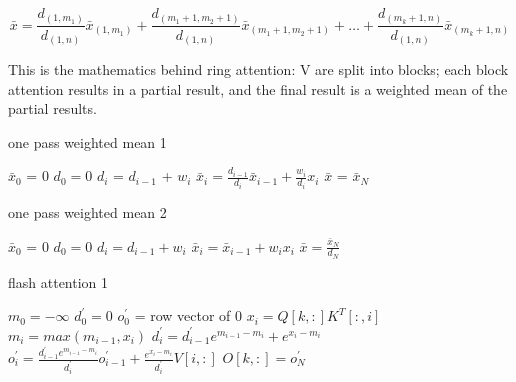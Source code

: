 \documentclass[a4paper]{article}
\begin{document}
    \begin{equation}
        \bar{x} = \frac{d_{(1,m_{1})}}{d_{(1,n)}} \bar{x}_{(1,m_{1})} + \frac{d_{(m_{1}+1,m_{2}+1)}}{d_{(1,n)}} \bar{x}_{(m_{1}+1,m_{2}+1)} +\dots + \frac{d_{(m_{k}+1,n)}}{d_{(1,n)}} \bar{x}_{(m_{k}+1,n)}
    \end{equation}

    This is the mathematics behind ring attention: V are split into blocks; each block attention results in a partial result, and the final result is a weighted mean of the partial results.

    \begin{algorithm}
        \caption{one pass weighted mean 1}
        \label{wm1}
        \begin{algorithmic}[1]
            \State $\bar{x}_{0}$ = $0$
            \State $d_0 = 0$
                \State $d_{i}$ = $d_{i-1}$ + $w_{i}$
                \State $\bar{x}_{i} = \frac{d_{i-1}}{ d_{i}} \bar{x}_{i-1}   + \frac{w_i}{d_i}x_i$
            \EndFor
            \State $\bar{x}$ = $\bar{x}_{N}$
        \end{algorithmic}
    \end{algorithm}


    \begin{algorithm}
        \caption{one pass weighted mean 2}
        \label{wm2}
        \begin{algorithmic}[1]
            \State $\bar{x}_{0}$ = $0$
            \State $d_0 = 0$
                \State $d_{i} = d_{i-1} + w_{i}$
                \State $\bar{x}_{i} = \bar{x}_{i-1}+w_{i}x_i$
            \EndFor
            \State $\bar{x} = \frac{\bar{x}_{N}}{d_N}$
        \end{algorithmic}
    \end{algorithm}

    \begin{algorithm}
        \caption{flash attention 1}
        \label{fa1}
        \begin{algorithmic}[1]
            \State $m_0 = -\infty$
            \State $d^\prime_0 = 0 $
            \State $o^\prime_{0}$ = row vector  of 0
                \State $x_{i} = Q[k,:]K^T[:,i] $
                \State $m_{i} =  max(m_{i-1}, x_{i})$
                \State $d^{\prime}_i = d^{\prime}_{i-1} e^{m_{i-1}-m_{i}} + e^{x_i - m_i}$
                \State $o^\prime_{i} = \frac{d^{\prime}_{i-1}e^{m_{i-1}-m_{i}}}{d^{\prime}_{i}} o^\prime_{i-1} + \frac{e^{x_i-m_i}}{d^{\prime}_{i}}V[i,:]$
            \EndFor
            \State $O[k,:] = o^\prime_{N}$
        \end{algorithmic}
    \end{algorithm}
\end{document}
